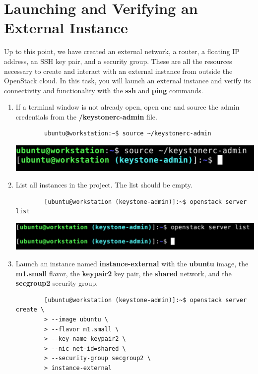 \documentclass[letterpaper, 12pt]{article}
\begin{document}
\section{Launching and Verifying an External Instance}
\label{sec:launching_an_external_isntance}
Up to this point, we have created an external network, a router, a floating IP address, an SSH key pair, and a security group.
These are all the resources necessary to create and interact with an external instance from outside the OpenStack cloud.
In this task, you will launch an external instance and verify its connectivity and functionality with the \textbf{ssh} and \textbf{ping} commands.

\begin{enumerate}
    \item If a terminal window is not already open, open one and source the admin credentials from the \textbf{\texttildemid/keystonerc-admin} file.
    \begin{lstlisting}
        ubuntu@workstation:~$ source ~/keystonerc-admin
    \end{lstlisting}

    \begin{center}
        \includegraphics[width=\linewidth]{images/part6/step1.png}
    \end{center}

    \item List all instances in the project.
    The list should be empty.
    \begin{lstlisting}
        [ubuntu@workstation (keystone-admin)]:~$ openstack server list
    \end{lstlisting}

    \begin{center}
        \includegraphics[width=\linewidth]{images/part6/step2.png}
    \end{center}

    \item Launch an instance named \textbf{instance-external} with the \textbf{ubuntu} image, the \textbf{m1.small} flavor, the \textbf{keypair2} key pair, the \textbf{shared} network, and the \textbf{secgroup2} security group.
    \begin{lstlisting}
        [ubuntu@workstation (keystone-admin)]:~$ openstack server create \
        > --image ubuntu \
        > --flavor m1.small \
        > --key-name keypair2 \
        > --nic net-id=shared \
        > --security-group secgroup2 \
        > instance-external
    \end{lstlisting}


\end{enumerate}
\end{document}
